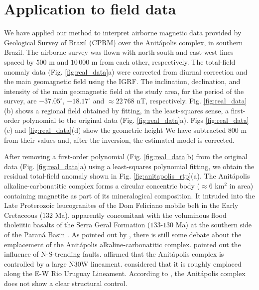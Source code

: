 \section{Application to field data}

We have applied our method to interpret airborne magnetic data provided by 
Geological Survey of Brazil (CPRM) over the Anit{\'a}polis complex, 
in southern Brazil. 
The airborne survey was flown with north-south and east-west lines spaced by $500$ m and $10\,000$ m from each other, respectively. 
The total-field anomaly data (Fig. \ref{fig:real_data}a) were corrected from diurnal correction and the main geomagnetic field using the IGRF. 
The inclination, declination, and intensity of the main geomagnetic field at the study area, 
for the period of the survey, are $-37.05^{\circ}$, $-18.17^{\circ}$ and 
$\approx 22 \, 768 $ nT, respectively.
Fig. \ref{fig:real_data}(b) shows a regional field obtained by fitting, in the least-squares sense, a first-order polynomial to the original data (Fig. \ref{fig:real_data}a).
Figs \ref{fig:real_data}(c) and \ref{fig:real_data}(d) show the geometric height
We have subtracted 800 m from their values and, after the inversion, the estimated model is corrected.  

After removing a first-order polynomial (Fig. \ref{fig:real_data}b) from the original data  
(Fig. \ref{fig:real_data}a) using a least-squares polynomial fitting, we obtain the residual total-field anomaly shown in Fig. \ref{fig:anitapolis_rtp}(a).
The Anit{\'a}polis alkaline-carbonatitic complex forms a circular concentric body 
($\approx 6$ km$^{2}$ in area) containing magnetite as part of its mineralogical 
composition. 
It intruded into the Late Proterozoic leucogranites of the Dom Feliciano 
mobile belt in the Early Cretaceous ($132$ Ma), apparently concomitant with the 
voluminous flood tholeiitic basalts of the Serra Geral Formation ($133$-$130$ Ma) 
at the southern side of the Paran{\'a} Basin \citep{gibson-1999, scheibe-etal2005}.
As pointed out by \citet{GOMES2018}, there is still some debate about the emplacement 
of the Anit{\'a}polis alkaline-carbonatitic complex. 
\citet{melcher-coutinho1966} pointed out the influence of N-S-trending faults.
\citet{horbach-marimon1980} affirmed that the Anit{\'a}polis complex is controlled by 
a large N30W lineament. 
\citet{scheibe-etal2005} considered that it is roughly emplaced along the E-W Rio 
Uruguay Lineament. 
According to \citet{riccomini-etal2005}, the Anit{\'a}polis 
complex does not show a clear structural control. 

